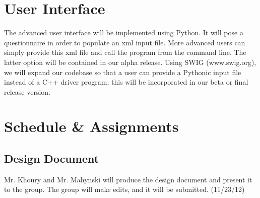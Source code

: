 \documentclass[10pt]{article}
\begin{document}
\section{User Interface}
The advanced user interface will be implemented using Python. It will pose a questionnaire in order to populate an xml input file.  More advanced users can simply provide this xml file and call the program from the command line.  The latter option will be contained in our alpha release.  Using SWIG (www.swig.org), we will expand our codebase so that a user can provide a Pythonic input file instead of a C++ driver program; this will be incorporated in our beta or final release version.


\section{Schedule \& Assignments}
\subsection{Design Document}
Mr. Khoury and Mr. Mahynski will produce the design document and present it to the group. The group will make edits, and it will be submitted. (11/23/12)
\end{document}
